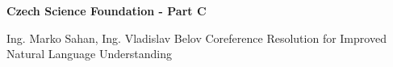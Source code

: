 \documentclass[11pt,american,oneside]{article}
\begin{document}
{\Large  \noindent \textbf{Czech Science Foundation - Part C}}

\vspace{.25cm}
\begin{minipage}{.75\textwidth}
{\noindent

    \begin{description}[style=unboxed,leftmargin=0cm,labelindent=0cm]
        \customitem[Applicants:] Ing. Marko Sahan, Ing. Vladislav Belov
         Coreference Resolution for Improved Natural Language Understanding
    \end{description}

}
\end{minipage}




\end{document}
